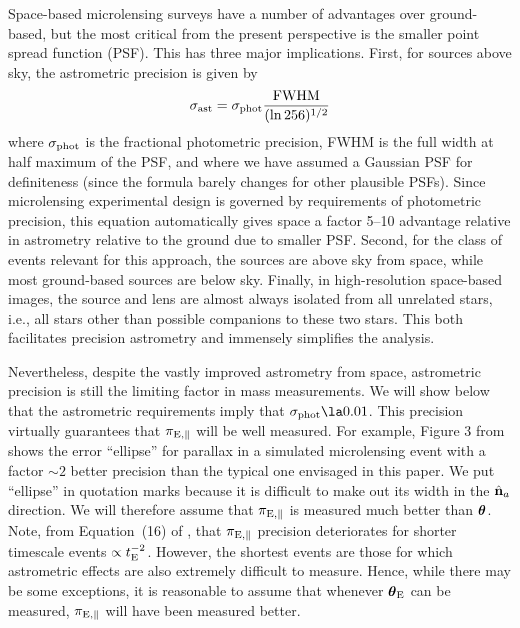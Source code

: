 \documentclass[12pt,preprint]{aastex}
\newcommand{\bdv}[1]{\mbox{\boldmath$#1$}}
\def\fwhm{{\rm FWHM}}
\def\e{{\rm E}}
\def\btheta{{\bdv\theta}}
\begin{document}
Space-based microlensing surveys have a number of advantages over ground-based,
but the most critical from the present perspective is the smaller 
point spread function (PSF).  This has three major implications.  
First, for sources above sky,
the astrometric precision is given by
\begin{equation}
\sigma_{\rm ast} =\sigma_{\rm phot}{\fwhm\over (\ln 256)^{1/2}}
\label{eqn:sigmaast}
\end{equation}
where $\sigma_{\rm phot}$ is the fractional photometric precision,
FWHM is the full width at half maximum of the PSF, and where we have
assumed a Gaussian PSF for definiteness (since the formula barely
changes for other plausible PSFs).  Since microlensing experimental
design is governed by requirements of photometric precision, this equation
automatically gives space a factor 5--10 advantage relative in astrometry
relative to the ground due to smaller PSF.  
Second, for the class of events relevant
for this approach, the sources are above sky from space, while 
most ground-based sources are below sky.  Finally, in high-resolution
space-based images, the source and lens are almost always isolated
from all unrelated stars, i.e., all stars other than possible companions
to these two stars.  This both facilitates precision astrometry and
immensely simplifies the analysis.

Nevertheless, despite the vastly improved astrometry from space, 
astrometric precision is still the limiting factor in mass measurements.
We will show below that the astrometric requirements imply that
$\sigma_{\rm phot}\la 0.01$.  This precision virtually
guarantees that $\pi_{\e,\parallel}$
will be well measured.  For example, Figure 3 from \citet{gould12}
shows the error ``ellipse'' for parallax in a simulated microlensing event with
a factor $\sim 2$ better precision than the typical one envisaged 
in this paper.  We put
``ellipse'' in quotation marks because it is difficult to make out
its width in the $\hat{\bf n}_a$ direction.  We will therefore assume
that $\pi_{\e,\parallel}$ is measured much better than $\btheta$.
Note, from Equation~(16) of \citet{gould12}, that $\pi_{\e,\parallel}$
precision deteriorates for shorter timescale events $\propto t_\e^{-2}$.
However, the shortest events are those 
for which astrometric effects are also extremely
difficult to measure.  Hence, while there may be some exceptions,
it is reasonable to assume that whenever $\btheta_\e$ can be measured,
$\pi_{\e,\parallel}$ will have been measured better.
\end{document}
